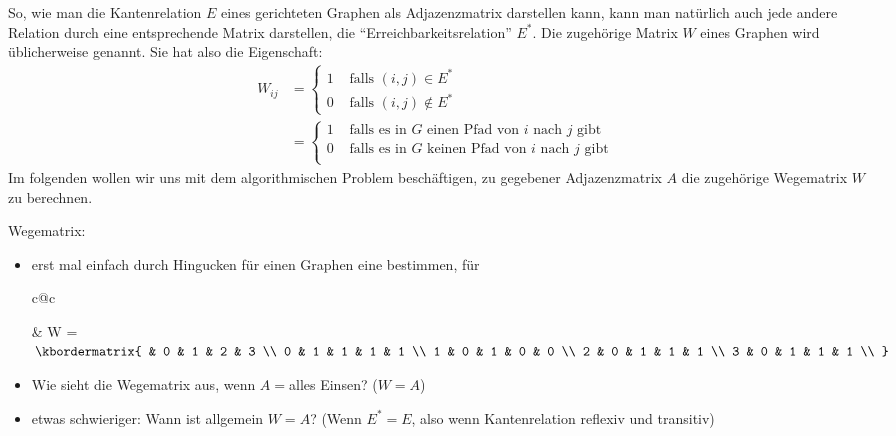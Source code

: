 So, wie man die Kantenrelation $E$ eines gerichteten Graphen als
Adjazenzmatrix darstellen kann, kann man natürlich auch jede andere
Relation durch eine entsprechende Matrix darstellen, \zB die
"`Erreichbarkeitsrelation"' $E^*$. Die zugehörige Matrix $W$ eines
Graphen wird üblicherweise 
genannt. Sie hat also die Eigenschaft:
\begin{align*}
  W_{ij} &= \begin{cases}
    1 & \text{ falls } (i,j)\in E^* \\
    0 & \text{ falls } (i,j)\notin E^*
  \end{cases} \\
  &= \begin{cases}
    1 & \text{ falls es in $G$ einen Pfad von $i$ nach $j$ gibt } \\
    0 & \text{ falls es in $G$ keinen Pfad von $i$ nach $j$ gibt } \\
  \end{cases}
\end{align*}
% 
Im folgenden wollen wir uns mit dem algorithmischen Problem
beschäftigen, zu gegebener Adjazenzmatrix $A$ die zugehörige
Wegematrix $W$ zu berechnen.

\begin{tutorium}
  Wegematrix:
  \begin{itemize}
  \item erst mal einfach durch Hingucken für einen Graphen eine
    bestimmen, \zB für

    \begin{tabular}{c@{\hspace*{15mm}}c}
      &
      W = $\kbordermatrix{
        & 0 & 1 & 2 & 3 \\
        0 & 1 & 1 & 1 & 1 \\
        1 & 0 & 1 & 0 & 0 \\
        2 & 0 & 1 & 1 & 1 \\
        3 & 0 & 1 & 1 & 1 \\
      }$
    \end{tabular}
  \item Wie sieht die Wegematrix aus, wenn $A=$alles Einsen? ($W=A$)
  \item etwas schwieriger: Wann ist allgemein $W=A$? (Wenn $E^*=E$,
    also wenn Kantenrelation reflexiv und transitiv)
  \end{itemize}
\end{tutorium}

